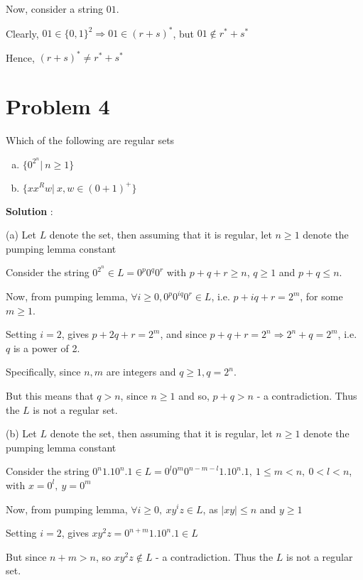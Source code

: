 \documentclass{article}
\begin{document}
    Now, consider a string $01$.
    
    Clearly, $01 \in \{0, 1 \}^2 \Rightarrow 01 \in (r + s)^*$, but $01 \notin r^* + s^*$
 
    Hence, $(r+s)^* \neq  r^* + s^*$
    
    
    \section*{Problem 4} Which of the following are regular sets
    \begin{enumerate}[(a)]
        \item $\{ 0^{2^n} |~ n \geq 1\}$
        \item $\{ xx^Rw |~ x, w \in (0 + 1)^+ \}$
    \end{enumerate}
    
    \textbf{Solution} : 

    (a) Let $L$ denote the set, then assuming that it is regular, let $n \geq 1$ denote the pumping lemma constant

    \quad Consider the string $0^{2^n} \in L = 0^{p}0^{q}0^{r}$ with $p + q + r \geq n$, $q \geq 1$ and $p + q \leq n$. 
    
    \quad Now, from pumping lemma, $\forall i \geq 0,0 ^{p}0^{iq}0^{r} \in L$, i.e. $p + iq + r = 2^m$, for some $m \geq 1$. 
    
    \quad Setting $i = 2$, gives $p + 2q + r = 2^m$, and since $p + q + r = 2^n \Rightarrow 2^n + q = 2^m$, i.e. $q$ is a power of 2. 
    
    \quad Specifically, since $n, m$ are integers and $q \geq 1, q = 2^n$.
    
    \quad But this means that $q > n$, since $n \geq 1$
    and so, $p + q > n$  - a contradiction. Thus the $L$ is not a regular set.
    
    (b) Let $L$ denote the set, then assuming that it is regular, let $n \geq 1$ denote the pumping lemma constant
    
    \quad Consider the string $0^n1.10^n.1 \in L = 0^{l}0^{m}0^{n - m - l}1.10^n.1, ~1 \leq m < n, ~0 < l < n$, with $x = 0^l, ~ y = 0^{m}$
    
    \quad Now, from pumping lemma, $\forall i \geq 0, ~xy^iz \in L$, as $|xy| \leq n$ and $y \geq 1$

    \quad Setting $i = 2$, gives $xy^2z = 0^{n + m}1.10^n.1 \in L$ 
    
    \quad But since $n + m > n$, so $xy^2z \notin L$ - a contradiction. Thus the $L$ is not a regular set. 
     
\end{document}
